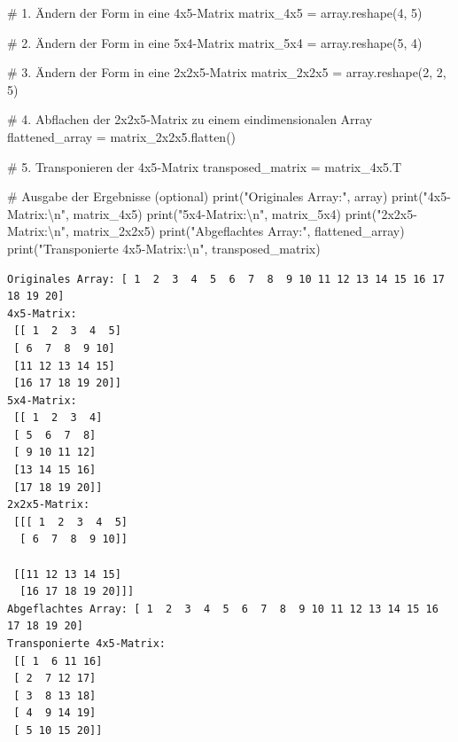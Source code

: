 \documentclass[
  letterpaper,
  DIV=11,
  numbers=noendperiod]{scrreprt}
\newenvironment{Shaded}{\begin{snugshade}}{\end{snugshade}}
\newcommand{\BuiltInTok}[1]{\textcolor[rgb]{0.00,0.23,0.31}{#1}}
\newcommand{\CharTok}[1]{\textcolor[rgb]{0.13,0.47,0.30}{#1}}
\newcommand{\CommentTok}[1]{\textcolor[rgb]{0.37,0.37,0.37}{#1}}
\newcommand{\DecValTok}[1]{\textcolor[rgb]{0.68,0.00,0.00}{#1}}
\newcommand{\NormalTok}[1]{\textcolor[rgb]{0.00,0.23,0.31}{#1}}
\newcommand{\OperatorTok}[1]{\textcolor[rgb]{0.37,0.37,0.37}{#1}}
\newcommand{\StringTok}[1]{\textcolor[rgb]{0.13,0.47,0.30}{#1}}
\begin{document}
\begin{tcolorbox}
\begin{Shaded}
\begin{Highlighting}[]
\CommentTok{\# 1. Ändern der Form in eine 4x5{-}Matrix}
\NormalTok{matrix\_4x5 }\OperatorTok{=}\NormalTok{ array.reshape(}\DecValTok{4}\NormalTok{, }\DecValTok{5}\NormalTok{)}

\CommentTok{\# 2. Ändern der Form in eine 5x4{-}Matrix}
\NormalTok{matrix\_5x4 }\OperatorTok{=}\NormalTok{ array.reshape(}\DecValTok{5}\NormalTok{, }\DecValTok{4}\NormalTok{)}

\CommentTok{\# 3. Ändern der Form in eine 2x2x5{-}Matrix}
\NormalTok{matrix\_2x2x5 }\OperatorTok{=}\NormalTok{ array.reshape(}\DecValTok{2}\NormalTok{, }\DecValTok{2}\NormalTok{, }\DecValTok{5}\NormalTok{)}

\CommentTok{\# 4. Abflachen der 2x2x5{-}Matrix zu einem eindimensionalen Array}
\NormalTok{flattened\_array }\OperatorTok{=}\NormalTok{ matrix\_2x2x5.flatten()}

\CommentTok{\# 5. Transponieren der 4x5{-}Matrix}
\NormalTok{transposed\_matrix }\OperatorTok{=}\NormalTok{ matrix\_4x5.T}

\CommentTok{\# Ausgabe der Ergebnisse (optional)}
\BuiltInTok{print}\NormalTok{(}\StringTok{"Originales Array:"}\NormalTok{, array)}
\BuiltInTok{print}\NormalTok{(}\StringTok{"4x5{-}Matrix:}\CharTok{\textbackslash{}n}\StringTok{"}\NormalTok{, matrix\_4x5)}
\BuiltInTok{print}\NormalTok{(}\StringTok{"5x4{-}Matrix:}\CharTok{\textbackslash{}n}\StringTok{"}\NormalTok{, matrix\_5x4)}
\BuiltInTok{print}\NormalTok{(}\StringTok{"2x2x5{-}Matrix:}\CharTok{\textbackslash{}n}\StringTok{"}\NormalTok{, matrix\_2x2x5)}
\BuiltInTok{print}\NormalTok{(}\StringTok{"Abgeflachtes Array:"}\NormalTok{, flattened\_array)}
\BuiltInTok{print}\NormalTok{(}\StringTok{"Transponierte 4x5{-}Matrix:}\CharTok{\textbackslash{}n}\StringTok{"}\NormalTok{, transposed\_matrix)}
\end{Highlighting}
\end{Shaded}

\begin{verbatim}
Originales Array: [ 1  2  3  4  5  6  7  8  9 10 11 12 13 14 15 16 17 18 19 20]
4x5-Matrix:
 [[ 1  2  3  4  5]
 [ 6  7  8  9 10]
 [11 12 13 14 15]
 [16 17 18 19 20]]
5x4-Matrix:
 [[ 1  2  3  4]
 [ 5  6  7  8]
 [ 9 10 11 12]
 [13 14 15 16]
 [17 18 19 20]]
2x2x5-Matrix:
 [[[ 1  2  3  4  5]
  [ 6  7  8  9 10]]

 [[11 12 13 14 15]
  [16 17 18 19 20]]]
Abgeflachtes Array: [ 1  2  3  4  5  6  7  8  9 10 11 12 13 14 15 16 17 18 19 20]
Transponierte 4x5-Matrix:
 [[ 1  6 11 16]
 [ 2  7 12 17]
 [ 3  8 13 18]
 [ 4  9 14 19]
 [ 5 10 15 20]]
\end{verbatim}


\end{tcolorbox}
\end{document}
